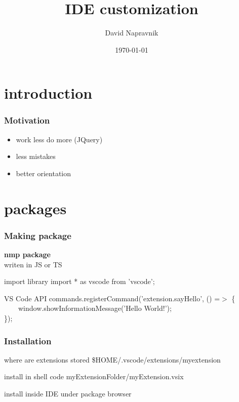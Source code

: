 \documentclass{beamer}
\title[Short title]{IDE customization} %
\author{David Napravnik} %
\institute[mff] %
{
Charles University \\ %
\medskip
\textit{ebrithil@nogare.cz} %
}
\date{\today} %
\begin{document}
\begin{frame}
\titlepage %
\end{frame}


\section{introduction}

\begin{frame}
\frametitle{Motivation}
\begin{itemize}
\item work less do more (JQuery)
\item less mistakes
\item better orientation
\end{itemize}
\end{frame}


\section{packages}
\begin{frame}
\frametitle{Making package}
\textbf{nmp package}\\
writen in JS or TS
\begin{block}{import library}
import * as vscode from 'vscode';
\end{block}

\begin{block}{VS Code API}
commands.registerCommand('extension.sayHello', () =$>$ \{\\
~~~~window.showInformationMessage('Hello World!');\\
\});
\end{block}
\end{frame}

\begin{frame}
\frametitle{Installation}
\begin{block}{where are extensions stored}
\$HOME/.vscode/extensions/myextension
\end{block}
\begin{block}{install in shell}
code myExtensionFolder/myExtension.vsix
\end{block}
install inside IDE under package browser
\end{frame}
\end{document}
